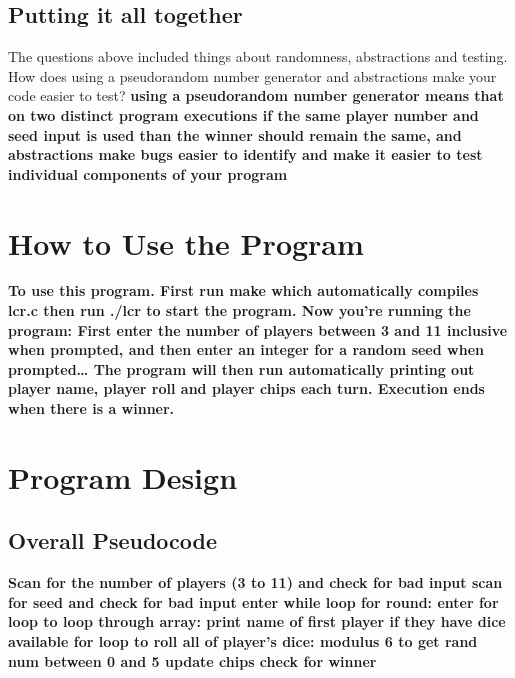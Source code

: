 \documentclass{article}
\begin{document}
\subsection{Putting it all together}

The questions above included things about randomness, abstractions and testing. How does using a pseudorandom number generator and abstractions make your code easier to test?\textbf{
using a pseudorandom number generator means that on two distinct program executions if the same player number and seed input is used than the winner should remain the same, and abstractions make bugs easier to identify and make it easier to test individual components of your program
}
\section{How to Use the Program}
\textbf{
To use this program. First run make which automatically compiles lcr.c then run ./lcr to start the program. Now you're running the program: First enter the number of players between 3 and 11 inclusive when prompted, and then enter an integer for a random seed when prompted… The program will then run automatically printing out player name, player roll and player chips each turn. Execution ends when there is a winner.
}
\section{Program Design}

\subsection{Overall Pseudocode}
\textbf{
Scan for the number of players (3 to 11) and check for bad input
scan for seed and check for bad input
enter while loop for round:
	enter for loop to loop through array:
		print name of first player if they have dice available
		for loop to roll all of player's dice:
			modulus 6 to get rand num between 0 and 5
			update chips
		check for winner
}
\end{document}
